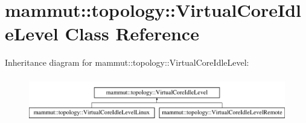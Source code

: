 \hypertarget{classmammut_1_1topology_1_1VirtualCoreIdleLevel}{\section{mammut\-:\-:topology\-:\-:Virtual\-Core\-Idle\-Level Class Reference}
\label{classmammut_1_1topology_1_1VirtualCoreIdleLevel}
}
Inheritance diagram for mammut\-:\-:topology\-:\-:Virtual\-Core\-Idle\-Level\-:\begin{figure}[H]
\begin{center}
\leavevmode
\includegraphics[height=1.992882cm]{classmammut_1_1topology_1_1VirtualCoreIdleLevel}
\end{center}
\end{figure}
